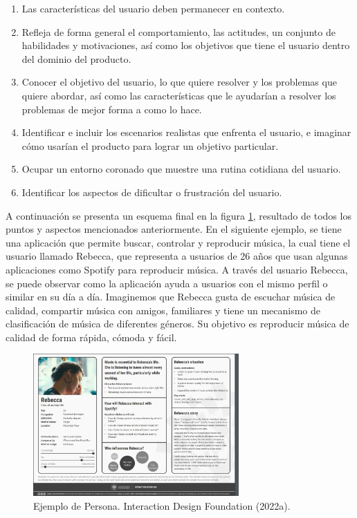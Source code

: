 \begin{enumerate}
  \item Las características del usuario deben permanecer en contexto.
  \item Refleja de forma general el comportamiento, las actitudes, un conjunto de habilidades y motivaciones, así como los objetivos que tiene el usuario dentro del dominio del producto.
  \item Conocer el objetivo del usuario, lo que quiere resolver y los problemas que quiere abordar, así como las características que le ayudarían a resolver los problemas de mejor forma a como lo hace.
  \item Identificar e incluir los escenarios realistas que enfrenta el usuario, e imaginar cómo usarían el producto para lograr un objetivo particular.
  \item Ocupar un entorno coronado que muestre una rutina cotidiana del usuario.
  \item Identificar los aspectos de dificultar o frustración del usuario.
\end{enumerate}

A continuación se presenta un esquema final en la figura \ref{fig:34}, resultado de todos los puntos y aspectos mencionados anteriormente. En el siguiente ejemplo, se tiene una aplicación que permite buscar, controlar y reproducir música, la cual tiene el usuario llamado Rebecca, que representa a usuarios de 26 años que usan algunas aplicaciones como Spotify para reproducir música. A través del usuario Rebecca, se puede observar como la aplicación ayuda a usuarios con el mismo perfil o similar en su día a día. Imaginemos que Rebecca gusta de escuchar música de calidad, compartir música con amigos, familiares y tiene un mecanismo de clasificación de música de diferentes géneros. Su objetivo es reproducir música de calidad de forma rápida, cómoda y fácil.

\begin{figure}[H]
  \centering
  \includegraphics[width=0.70\textwidth]{Cap3/Figuras/EjemploPersona.jpg}
  \caption{Ejemplo de Persona. Interaction Design Foundation (2022a).}
  \label{fig:34}
\end{figure}

